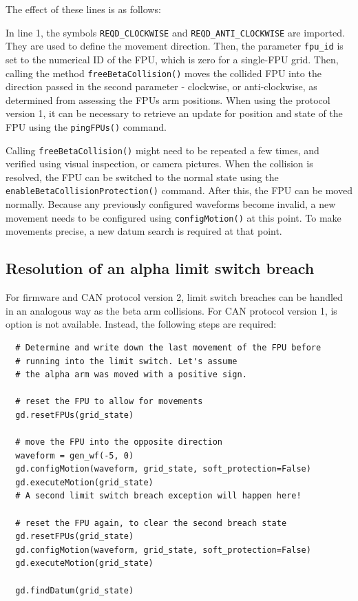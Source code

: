 \documentclass[11pt,a4paper]{scrartcl}
\begin{document}
The effect of these lines is as follows:

In line 1, the symbols \texttt{REQD\_CLOCKWISE} and
\texttt{REQD\_ANTI\_CLOCKWISE} are imported. They are used to define
the movement direction. Then, the parameter \texttt{fpu\_id} is set to
the numerical ID of the FPU, which is zero for a single-FPU
grid. Then, calling the method \texttt{freeBetaCollision()} moves the
collided FPU into the direction passed in the second parameter -
clockwise, or anti-clockwise, as determined from assessing the FPUs
arm positions. When using the protocol version 1, it can be necessary
to retrieve an update for position and state of the FPU using the
\texttt{pingFPUs()} command.

Calling \texttt{freeBetaCollision()} might need to be repeated a few
times, and verified using visual inspection, or camera pictures. When
the collision is resolved, the FPU can be switched to the normal state
using the \texttt{enableBetaCollisionProtection()} command.  After
this, the FPU can be moved normally. Because any previously configured
waveforms become invalid, a new movement needs to be configured using
\texttt{configMotion()} at this point. To make movements precise, a
new datum search is required at that point.

\subsection{Resolution of an alpha limit switch breach}
For firmware and CAN protocol  version 2, limit switch
breaches can be handled in an analogous way as the
beta arm collisions. For CAN protocol version 1,
is option is not available. Instead, the following
steps are required:

\begin{verbatim}
  # Determine and write down the last movement of the FPU before
  # running into the limit switch. Let's assume
  # the alpha arm was moved with a positive sign.

  # reset the FPU to allow for movements
  gd.resetFPUs(grid_state)

  # move the FPU into the opposite direction
  waveform = gen_wf(-5, 0)
  gd.configMotion(waveform, grid_state, soft_protection=False)
  gd.executeMotion(grid_state)
  # A second limit switch breach exception will happen here!

  # reset the FPU again, to clear the second breach state
  gd.resetFPUs(grid_state)
  gd.configMotion(waveform, grid_state, soft_protection=False)
  gd.executeMotion(grid_state)

  gd.findDatum(grid_state)
  
\end{verbatim}
  
\end{document}
